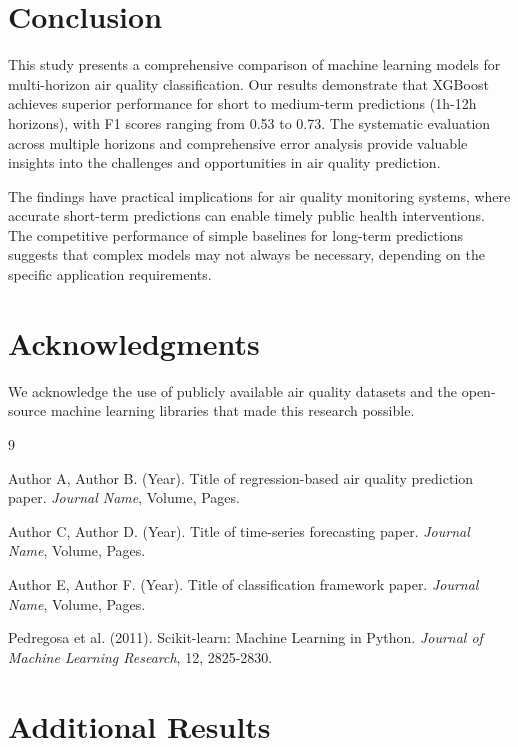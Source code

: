 \documentclass[12pt,a4paper]{article}
\begin{document}
\section{Conclusion}

This study presents a comprehensive comparison of machine learning models for multi-horizon air quality classification. Our results demonstrate that XGBoost achieves superior performance for short to medium-term predictions (1h-12h horizons), with F1 scores ranging from 0.53 to 0.73. The systematic evaluation across multiple horizons and comprehensive error analysis provide valuable insights into the challenges and opportunities in air quality prediction.

The findings have practical implications for air quality monitoring systems, where accurate short-term predictions can enable timely public health interventions. The competitive performance of simple baselines for long-term predictions suggests that complex models may not always be necessary, depending on the specific application requirements.

\section{Acknowledgments}

We acknowledge the use of publicly available air quality datasets and the open-source machine learning libraries that made this research possible.


\begin{thebibliography}{9}

Author A, Author B. (Year). Title of regression-based air quality prediction paper. \textit{Journal Name}, Volume, Pages.

Author C, Author D. (Year). Title of time-series forecasting paper. \textit{Journal Name}, Volume, Pages.

Author E, Author F. (Year). Title of classification framework paper. \textit{Journal Name}, Volume, Pages.

Pedregosa et al. (2011). Scikit-learn: Machine Learning in Python. \textit{Journal of Machine Learning Research}, 12, 2825-2830.

\end{thebibliography}

\appendix

\section{Additional Results}
\end{document}
